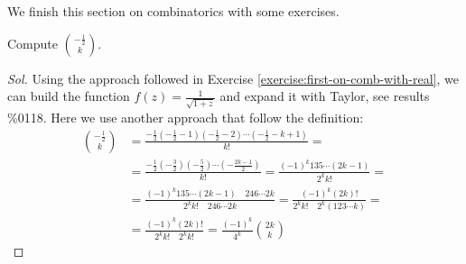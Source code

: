 We finish this section on combinatorics with some exercises.
\begin{exercise}
  Compute ${{ -\frac{1}{2} }\choose{k}} $.
\end{exercise}
\begin{proof}[Sol]
  Using the approach followed in Exercise
  \autoref{exercise:first-on-comb-with-real}, we can build the
  function $f(z) = \frac{1}{\sqrt{1+z}} $ and expand it with Taylor,
  see results \%0118.
  Here we use
  another approach that follow the definition:
  \begin{displaymath}
    \begin{split}
      {{- \frac{1}{2} }\choose{k}} &= \frac{- \frac{1}{2}(- \frac{1}{2}
        -1)(- \frac{1}{2}-2)\cdots(- \frac{1}{2}-k +1) }{k!} = \\
      &= \frac{- \frac{1}{2}(- \frac{3}{2})(- \frac{5}{2})\cdots(-
        \frac{2k-1}{2}) }{k!} =
      \frac{(-1)^k 1 3 5\cdots (2k-1) }{2^k k!} =\\
      &=\frac{(-1)^k 1 3 5\cdots (2k-1) \quad 2 4 6\cdots 2k } {2^k
        k!\quad 2 4 6\cdots 2k } = \frac{(-1)^k (2k)! }
      {2^k k!\quad 2^k(1 2 3 \cdots k) } =\\
      &= \frac{(-1)^k (2k)! } {2^k k!\quad 2^kk! } =\frac{(-1)^k}{4^k }
      {{2k}\choose{k}}
    \end{split}
  \end{displaymath}


\end{proof}
